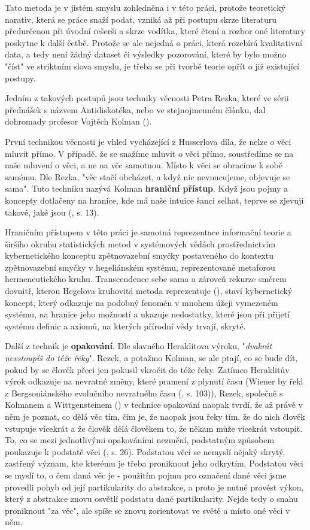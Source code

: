 \documentclass[11pt,a4paper]{article}
\begin{document}
Tato metoda je v jistém smyslu zohledněna i v této práci, protože teoretický narativ, která se práce snaží podat, vzniká až při postupu skrze literaturu předurčenou při úvodní rešerši a skrze vodítka, které čtení a rozbor oné literatury poskytne k další četbě. Protože se ale nejedná o práci, která rozebírá kvalitativní data, a tedy není žádný dataset či výsledky pozorování, které by bylo možno "číst" ve striktním slova smyslu, je třeba se při tvorbě teorie opřít o již existující postupy.

Jedním z takových postupů jsou techniky věcnosti Petra Rezka, které ve sérii přednášek s názvem Antidiskotéka, nebo ve stejnojmenném článku, dal dohromady profesor Vojtěch Kolman (\cite{kolman_antidiskoteka_2022}). 

První technikou věcnosti je vhled vycházející z Husserlova díla, že nelze o věci mluvit přímo. V případě, že se snažíme mluvit o věci přímo, soustředíme se na naše mluvení o věci, a ne na věc samotnou. Místo k věci se obracíme k sobě samému. Dle Rezka, "věc stačí obcházet, a když nic nevnucujeme, objevuje se sama". Tuto techniku nazývá Kolman \textbf{hraniční přístup}. Když jsou pojmy a koncepty dotlačeny na hranice, kde má naše intuice šanci selhat, teprve se zjevují takové, jaké jsou (\cite{rezek_telo_2010}, s. 13).

Hraničním přístupem v této práci je samotná reprezentace informační teorie a širšího okruhu statistických metod v systémových vědách prostřednictvím kybernetického konceptu zpětnovazební smyčky postaveného do kontextu zpětnovazební smyčky v hegeliánském systému, reprezentované metaforou hermeneutického kruhu. Transcendence sebe sama a zároveň rekurze směrem dovnitř, kterou Hegelova kruhovitá metoda reprezentuje (\cite{kainz_paradox_1988}), staví kybernetický koncept, který odkazuje na podobný fenomén v mnohem úžeji vymezeném systému, na hranice jeho možností a ukazuje nedostatky, které jsou při přijetí systému definic a axiomů, na kterých přírodní vědy trvají, skryté.

Další z technik je \textbf{opakování}. Dle slavného Heraklitova výroku, "\textit{dvakrát nevstoupíš do téže řeky}". Rezek, a potažmo Kolman, se ale ptají, co se bude dít, pokud by se člověk přeci jen pokusil vkročit do téže řeky. Zatímco Heraklitův výrok odkazuje na nevratné změny, které pramení z plynutí času (Wiener by řekl z Bergsoniánského evolučního nevratného času (\cite{wiener_cybernetics_2019}, s. 103)), Rezek, společně s Kolmanem a Wittgensteinem (\cite{wittgenstein_tractatus_2010}) v technice opakování naopak tvrdí, že až právě v něm je poznat, co dělá věc tím, čím je, že naopak jsou řeky tím, že do nich člověk vstupuje vícekrát a že člověk dělá člověkem to, že někam může vícekrát vstoupit. To, co se mezi jednotlivými opakováními nezmění, podstatným způsobem poukazuje k podstatě věci (\cite{rezek_telo_2010}, s. 26). Podstatou věci se nemyslí nějaký skrytý, zastřený význam, kte kterému je třeba proniknout jeho odkrytím. Podstatou věci se myslí to, o čem daná věc je - použitím pojmu pro označení dané věci jsme provedli pohyb od její partikularity do abstrakce, a proto je nutné provést výkon, který z abstrakce znovu osvětlí podstatu dané partikularity. Nejde tedy o snahu proniknout "za věc", ale spíše se znovu zorientovat ve světě a místo oné věci v něm.
\end{document}
